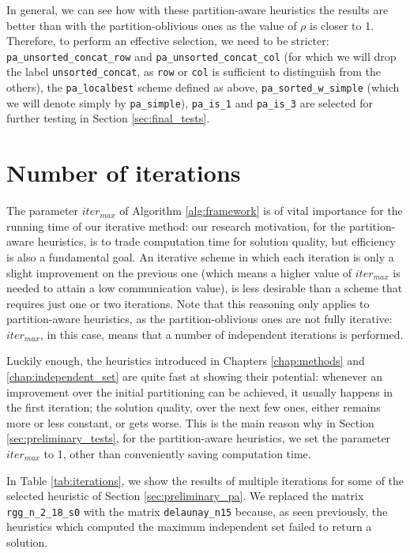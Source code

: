 In general, we can see how with these partition-aware heuristics the results are better than with the partition-oblivious ones as the value of $\rho$ is closer to 1. Therefore, to perform an effective selection, we need to be stricter: \verb|pa_unsorted_concat_row| and \verb|pa_unsorted_concat_col| (for which we will drop the label \verb|unsorted_concat|, as \verb|row| or \verb|col| is sufficient to distinguish from the others), the \verb|pa_localbest| scheme defined as above, \verb|pa_sorted_w_simple| (which we will denote simply by \verb|pa_simple|), \verb|pa_is_1| and \verb|pa_is_3| are selected for further testing in Section \ref{sec:final_tests}.

\section{Number of iterations} \label{sec:iter_max}

The parameter $iter_{max}$ of Algorithm \ref{alg:framework} is of vital importance for the running time of our iterative method: our research motivation, for the partition-aware heuristics, is to trade computation time for solution quality, but efficiency is also a fundamental goal. An iterative scheme in which each iteration is only a slight improvement on the previous one (which means a higher value of $iter_{max}$ is needed to attain a low communication value), is less desirable than a scheme that requires just one or two iterations. Note that this reasoning only applies to partition-aware heuristics, as the partition-oblivious ones are not fully iterative: $iter_{max}$, in this case, means that a number of independent iterations is performed.

Luckily enough, the heuristics introduced in Chapters \ref{chap:methods} and \ref{chap:independent_set} are quite fast at showing their potential: whenever an improvement over the initial partitioning can be achieved, it usually happens in the first iteration; the solution quality, over the next few ones, either remains more or less constant, or gets worse. This is the main reason why in Section \ref{sec:preliminary_tests}, for the partition-aware heuristics, we set the parameter $iter_{max}$ to 1, other than conveniently saving computation time.

In Table \ref{tab:iterations}, we show the results of multiple iterations for some of the selected heuristic of Section \ref{sec:preliminary_pa}. We replaced the matrix \verb|rgg_n_2_18_s0| with the matrix \verb|delaunay_n15| because, as seen previously, the heuristics which computed the maximum independent set failed to return a solution.

